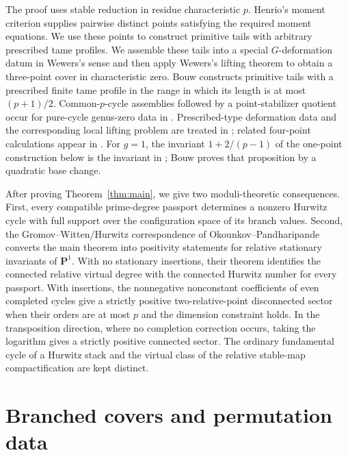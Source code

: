 \documentclass[10pt,a4paper]{amsart}
\numberwithin{equation}{section}
\begin{document}
The proof uses stable reduction in residue characteristic $p$.  Henrio's
moment criterion
\cite[Definition~3.14 and Proposition~3.16(b)]{Henrio} supplies pairwise
distinct points satisfying the required moment equations.  We use these
points to construct primitive tails with arbitrary prescribed tame profiles.
We assemble these tails into a special $G$-deformation datum in Wewers's
sense and then apply Wewers's lifting theorem
\cite{WewersMeta,WewersThree} to obtain a three-point cover in
characteristic zero.  Bouw
\cite[Section~3, especially the construction preceding Lemma~3.2 and
Lemma~3.2]{BouwAffine} constructs primitive tails with a prescribed finite
tame profile in the range in which its length is at most $(p+1)/2$.
Common-$p$-cycle assemblies followed by a point-stabilizer quotient occur
for pure-cycle genus-zero data in
\cite[Construction~4.2.3 and Propositions~4.2.4--4.2.5]{Eskin}.
Prescribed-type deformation data and the corresponding local lifting
problem are treated in \cite{BouwWewersZapponi}; related four-point
calculations appear in \cite{BouwOsserman}.  For $g=1$, the invariant
$1+2/(p-1)$ of the one-point construction below is the invariant in
\cite[Proposition~3.3]{BouwAffine}; Bouw proves that proposition by a
quadratic base change.

After proving Theorem~\ref{thm:main}, we give two moduli-theoretic
consequences.  First, every compatible prime-degree passport determines a
nonzero Hurwitz cycle with full support over the configuration space of its
branch values.  Second, the Gromov--Witten/Hurwitz correspondence of
Okounkov--Pandharipande \cite{OkounkovPandharipande} converts the main
theorem into positivity statements for relative stationary invariants of
$\mathbf P^1$.  With no stationary insertions, their theorem identifies the
connected relative virtual degree with the connected Hurwitz number for
every passport.  With insertions, the nonnegative nonconstant coefficients
of even completed cycles give a strictly positive two-relative-point
disconnected sector when their orders are at most $p$ and the dimension
constraint holds.  In the transposition direction, where no completion
correction occurs, taking the logarithm gives a strictly positive connected
sector.  The ordinary
fundamental cycle of a Hurwitz stack and the virtual class of the relative
stable-map compactification are kept distinct.

\section{Branched covers and permutation data}
\end{document}
